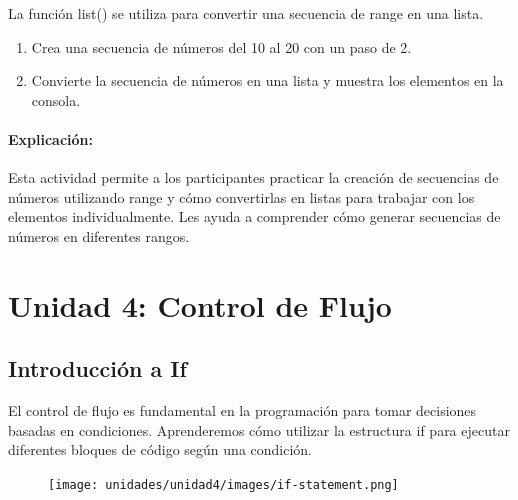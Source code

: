 \documentclass[
  a4paper,
  DIV=11,
  numbers=noendperiod,
  onepage,
  openany]{scrreprt}
\providecommand{\tightlist}{%
  \setlength{\itemsep}{0pt}\setlength{\parskip}{0pt}}\usepackage{longtable,booktabs,array}
\begin{document}
La función list() se utiliza para convertir una secuencia de range en
una lista.

\begin{tcolorbox}[enhanced jigsaw, toptitle=1mm, toprule=.15mm, title=\textcolor{quarto-callout-tip-color}{\faLightbulb}\hspace{0.5em}{Actividad Práctica}, colbacktitle=quarto-callout-tip-color!10!white, opacitybacktitle=0.6, titlerule=0mm, colback=white, left=2mm, bottomrule=.15mm, breakable, bottomtitle=1mm, rightrule=.15mm, colframe=quarto-callout-tip-color-frame, arc=.35mm, leftrule=.75mm, coltitle=black, opacityback=0]

\begin{enumerate}
\def\labelenumi{\arabic{enumi}.}
\tightlist
\item
  Crea una secuencia de números del 10 al 20 con un paso de 2.
\item
  Convierte la secuencia de números en una lista y muestra los elementos
  en la consola.
\end{enumerate}

\end{tcolorbox}

\subsection{Explicación:}\label{explicaciuxf3n-15}

Esta actividad permite a los participantes practicar la creación de
secuencias de números utilizando range y cómo convertirlas en listas
para trabajar con los elementos individualmente. Les ayuda a comprender
cómo generar secuencias de números en diferentes rangos.

\part{Unidad 4: Control de Flujo}

\chapter{Introducción a If}\label{introducciuxf3n-a-if}

El control de flujo es fundamental en la programación para tomar
decisiones basadas en condiciones. Aprenderemos cómo utilizar la
estructura if para ejecutar diferentes bloques de código según una
condición.

\begin{figure}

{\centering \texttt{[image: unidades/unidad4/images/if-statement.png]}

}

\end{figure}
\end{document}
